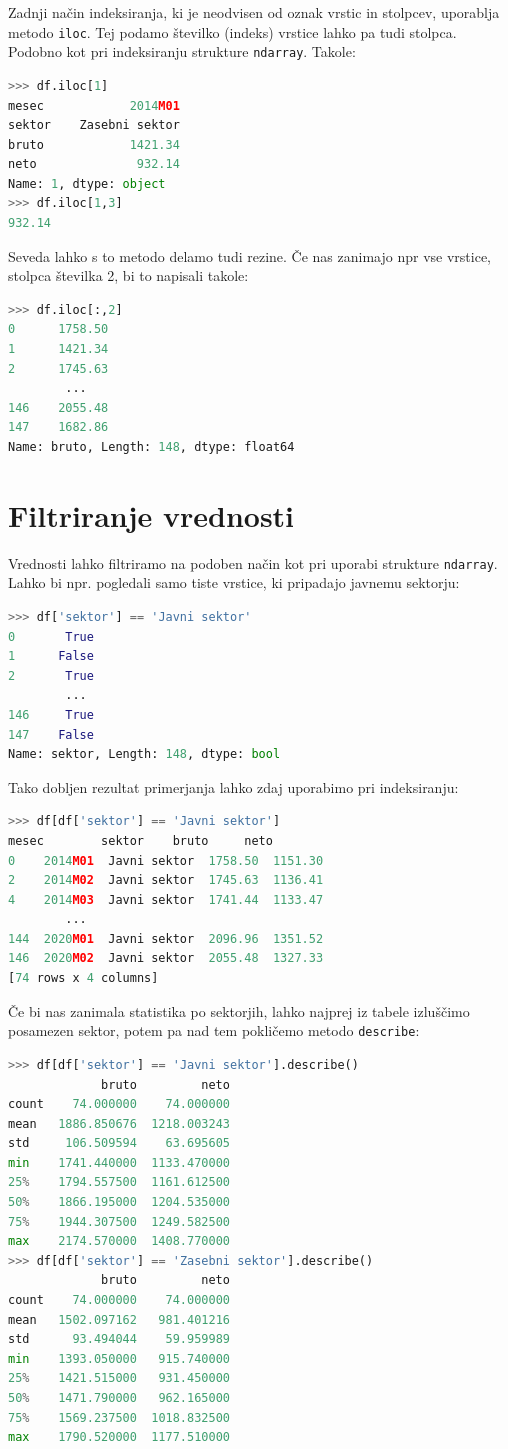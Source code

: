 Zadnji način indeksiranja, ki je neodvisen od oznak vrstic in stolpcev, uporablja metodo \texttt{iloc}. Tej podamo številko (indeks) vrstice lahko pa tudi stolpca. Podobno kot pri indeksiranju strukture \texttt{ndarray}. Takole:
\begin{lstlisting}[language=python]
>>> df.iloc[1]
mesec            2014M01
sektor    Zasebni sektor
bruto            1421.34
neto              932.14
Name: 1, dtype: object
>>> df.iloc[1,3]
932.14
\end{lstlisting}
Seveda lahko s to metodo delamo tudi rezine. Če nas zanimajo npr vse vrstice, stolpca številka 2, bi to napisali takole:
\begin{lstlisting}[language=python]
>>> df.iloc[:,2]
0      1758.50
1      1421.34
2      1745.63
        ...
146    2055.48
147    1682.86
Name: bruto, Length: 148, dtype: float64
\end{lstlisting}

\section{Filtriranje vrednosti}
Vrednosti lahko filtriramo na podoben način kot pri uporabi strukture \texttt{ndarray}. Lahko bi npr. pogledali samo tiste vrstice, ki pripadajo javnemu sektorju:
\begin{lstlisting}[language=python]
>>> df['sektor'] == 'Javni sektor'
0       True
1      False
2       True
        ...
146     True
147    False
Name: sektor, Length: 148, dtype: bool
\end{lstlisting}
Tako dobljen rezultat primerjanja lahko zdaj uporabimo pri indeksiranju:
\begin{lstlisting}[language=python]
>>> df[df['sektor'] == 'Javni sektor']
mesec        sektor    bruto     neto
0    2014M01  Javni sektor  1758.50  1151.30
2    2014M02  Javni sektor  1745.63  1136.41
4    2014M03  Javni sektor  1741.44  1133.47
        ...
144  2020M01  Javni sektor  2096.96  1351.52
146  2020M02  Javni sektor  2055.48  1327.33
[74 rows x 4 columns]
\end{lstlisting}
Če bi nas zanimala statistika po sektorjih, lahko najprej iz tabele izluščimo posamezen sektor, potem pa nad tem pokličemo metodo \texttt{describe}:
\begin{lstlisting}[language=python]
>>> df[df['sektor'] == 'Javni sektor'].describe()
             bruto         neto
count    74.000000    74.000000
mean   1886.850676  1218.003243
std     106.509594    63.695605
min    1741.440000  1133.470000
25%    1794.557500  1161.612500
50%    1866.195000  1204.535000
75%    1944.307500  1249.582500
max    2174.570000  1408.770000
>>> df[df['sektor'] == 'Zasebni sektor'].describe()
             bruto         neto
count    74.000000    74.000000
mean   1502.097162   981.401216
std      93.494044    59.959989
min    1393.050000   915.740000
25%    1421.515000   931.450000
50%    1471.790000   962.165000
75%    1569.237500  1018.832500
max    1790.520000  1177.510000
\end{lstlisting}

